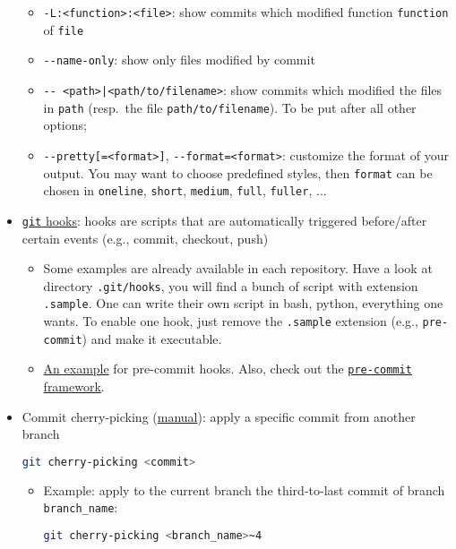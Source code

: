 \documentclass[a4paper,12pt,%
              final%
              ]{article}
\begin{document}
\begin{itemize}
\begin{itemize}
      \item \verb|-L:<function>:<file>|: show commits which modified function \texttt{function} of \texttt{file}
      \item \verb|--name-only|: show only files modified by commit
      \item \verb!-- <path>|<path/to/filename>!: show commits which modified the files in \texttt{path} (resp.\ the file \verb|path/to/filename|). To be put after all other options;
      \item \verb|--pretty[=<format>]|, \verb|--format=<format>|: customize the format of your output. You may want to choose predefined styles, then \texttt{format} can be chosen in \texttt{oneline}, \texttt{short}, \texttt{medium}, \texttt{full}, \texttt{fuller}, ...
    \end{itemize}
  \item \href{https://git-scm.com/book/en/v2/Customizing-Git-Git-Hooks}{\texttt{git} hooks}: hooks are scripts that are automatically triggered before/after certain events (e.g., commit, checkout, push)
      \begin{itemize}
        \item Some examples are already available in each repository. Have a look at directory \texttt{.git/hooks}, you will find a bunch of script with extension \texttt{.sample}. One can write their own script in bash, python, everything one wants. To enable one hook, just remove the \texttt{.sample} extension (e.g., \texttt{pre-commit}) and make it executable.
        \item \href{https://verdantfox.com/blog/how-to-use-git-pre-commit-hooks-the-hard-way-and-the-easy-way}{An example} for pre-commit hooks. Also, check out the \href{https://github.com/pre-commit/pre-commit-hooks}{\texttt{pre-commit} framework}.
      \end{itemize}
  \item Commit cherry-picking (\href{https://git-scm.com/docs/git-cherry-pick}{manual}): apply a specific commit from another branch
\begin{lstlisting}[language=bash]
git cherry-picking <commit>
\end{lstlisting}
    \begin{itemize}
      \item Example: apply to the current branch the third-to-last commit of branch \verb|branch_name|:
\begin{lstlisting}[language=bash]
git cherry-picking <branch_name>~4
\end{lstlisting}

\end{itemize}
\end{itemize}
\end{document}

